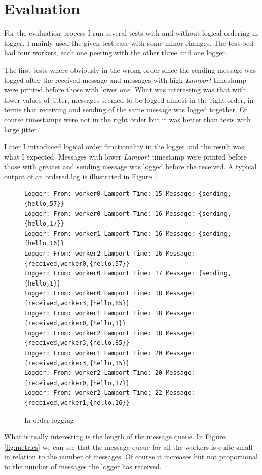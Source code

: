 \documentclass[a4paper, 11pt]{article}
\begin{document}
\section{Evaluation}

For the evaluation process I run several tests with and without logical ordering
in logger. I mainly used the given test case with some minor changes. The test
bed had four workers, each one peering with the other three and one logger.

The first tests where obviously in the wrong order since the sending message was
logged after the received message and messages with high \emph{Lamport}
timestamp were printed before those with lower one. What was interesting was
that with lower values of jitter, messages seemed to be logged almost in the
right order, in terms that receiving and sending of the same message was logged
together. Of course timestamps were not in the right order but it was better
than tests with large jitter.

Later I introduced logical order functionality in the logger and the result was
what I expected. Messages with lower \emph{Lamport} timestamp were printed
before those with greater and sending message was logged before the received.
A typical output of an ordered log is illustrated in Figure \ref{fig:ordered}

\begin{figure}[h!]
\footnotesize
\begin{verbatim}
Logger: From: worker0 Lamport Time: 15 Message: {sending,{hello,57}}
Logger: From: worker0 Lamport Time: 16 Message: {sending,{hello,17}}
Logger: From: worker1 Lamport Time: 16 Message: {sending,{hello,16}}
Logger: From: worker2 Lamport Time: 16 Message: {received,worker0,{hello,57}}
Logger: From: worker0 Lamport Time: 17 Message: {sending,{hello,1}}
Logger: From: worker0 Lamport Time: 18 Message: {received,worker3,{hello,85}}
Logger: From: worker1 Lamport Time: 18 Message: {received,worker0,{hello,1}}
Logger: From: worker2 Lamport Time: 18 Message: {received,worker3,{hello,85}}
Logger: From: worker1 Lamport Time: 20 Message: {received,worker3,{hello,15}}
Logger: From: worker2 Lamport Time: 20 Message: {received,worker0,{hello,17}}
Logger: From: worker2 Lamport Time: 22 Message: {received,worker1,{hello,16}}
\end{verbatim}

\caption{In order logging}
\label{fig:ordered}
\end{figure}

What is really interesting is the length of the message queue. In Figure
\ref{fig:metrics} we can see that the message queue for all the workers is quite
small in relation to the number of messages. Of course it increases but not
proportional to the number of messages the logger has received.
\end{document}
